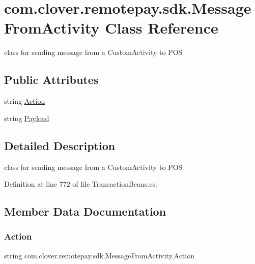 \hypertarget{classcom_1_1clover_1_1remotepay_1_1sdk_1_1_message_from_activity}{}\section{com.\+clover.\+remotepay.\+sdk.\+Message\+From\+Activity Class Reference}
\label{classcom_1_1clover_1_1remotepay_1_1sdk_1_1_message_from_activity}


class for sending message from a Custom\+Activity to P\+OS  


\subsection*{Public Attributes}
\begin{DoxyCompactItemize}
\item 
string \hyperlink{classcom_1_1clover_1_1remotepay_1_1sdk_1_1_message_from_activity_a77087b4d5c8e7761191610399c98355b}{Action}
\item 
string \hyperlink{classcom_1_1clover_1_1remotepay_1_1sdk_1_1_message_from_activity_afda5117692366e455d859d165f798243}{Payload}
\end{DoxyCompactItemize}


\subsection{Detailed Description}
class for sending message from a Custom\+Activity to P\+OS 



Definition at line 772 of file Transaction\+Beans.\+cs.



\subsection{Member Data Documentation}
\mbox{\label{classcom_1_1clover_1_1remotepay_1_1sdk_1_1_message_from_activity_a77087b4d5c8e7761191610399c98355b}} 
\subsubsection{\texorpdfstring{Action}{Action}}
{\footnotesize\ttfamily string com.\+clover.\+remotepay.\+sdk.\+Message\+From\+Activity.\+Action}



